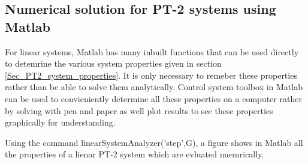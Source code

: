 \subsection{Numerical solution for PT-2 systems using Matlab}

For linear systems, Matlab has many inbuilt functions that can be used directly to detemrine the various system properties given in section \ref{Sec_PT2_system_properties}. It is only necessary to remeber these properties rather than be able to solve them analytically. Control system toolbox in Matlab can be used to convieniently determine all these properties on a computer rather by solving with pen and paper as well plot results to see these properties graphically for understanding.

Using the command \textcolor{mygray}{linearSystemAnalyzer('step',G)}, a figure shows in Matlab all the properties of a lienar PT-2 system which are evluated nuemrically.
